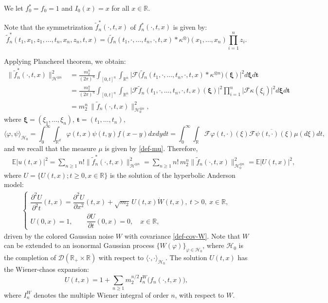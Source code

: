 \documentclass[12pt]{article}
\def\cD{\mathcal{D}}
\def\cF{\mathcal{F}}
\def\cH{\mathcal{H}}
\def\bE{\mathbb{E}}
\def\bR{\mathbb{R}}
\def\k{\kappa}
\begin{document}
We let $f_0^*=f_0=1$ and $I_0(x)=x$ for all $x \in \bR$.

\medskip

Note that the symmetrization 
$\widetilde{f}_n^*(\cdot,t,x)$ of $f_n^*(\cdot,t,x)$ is given by:
\[
\widetilde{f}_n^*(t_1,x_1,z_1,\ldots,t_n,x_n,z_n,t,x)= \big(\widetilde{f}_n(t_1,\cdot,\ldots,t_n,\cdot,t,x) * \k^{\otimes}\big)(x_1,\ldots,x_n) \prod_{i=1}^{n} z_i.
\]

Applying Plancherel theorem, we obtain:
\begin{align}
\nonumber
\|\widetilde{f}_n^*(\cdot,t,x)\|_{\cH^{\otimes n}}^2 &=\frac{m_2^n}{(2\pi)^n} \int_{[0,t]^n}\int_{\bR^n}\big|\cF \big(\widetilde{f}_n(t_1,\cdot,\ldots,t_n,\cdot,t,x)*\k^{\otimes n}\big)(\pmb{\xi})\big|^2 d\pmb{\xi} d\pmb{t}\\
\nonumber
& = \frac{m_2^n}{(2\pi)^n} \int_{[0,t]^n}\int_{\bR^n} \big|\cF \widetilde{f}_n(t_1,\cdot,\ldots,t_n,\cdot,t,x)(\pmb{\xi}) \big|^2 \prod_{i=1}^{n}\big|\cF \k(\xi_i)\big|^2 d\pmb{\xi}d\pmb{t}\\
\label{Poi-Gauss}
& = m_2^n \, \|\widetilde{f}_n(\cdot,t,x)\|_{\cH_0^{\otimes n}}^2,
\end{align}
where $\pmb{\xi}=(\xi_1,\ldots,\xi_n)$, $\pmb{t}=(t_1,\ldots,t_n)$, 
\[
\langle \varphi,\psi \rangle_{\cH_0}=\int_{0}^{\infty}\int_{\bR^d}\varphi(t,x)\psi(t,y)f(x-y)dxdydt 
=\int_0^{\infty}\int_{\bR}\cF \varphi(t,\cdot)(\xi)\overline{\cF \psi(t,\cdot)(\xi)}\mu(d\xi)dt,
\]
and we recall that the measure $\mu$ is given by \eqref{def-mu}. Therefore,
\begin{align*}
& \bE|u(t,x)|^2=\sum_{n\geq 1}n!\| \widetilde{f}_n^*(\cdot,t,x)\|_{\cH^{\otimes n}}^2=
\sum_{n\geq 1}n!\, m_2^n \|\widetilde{f}_n(\cdot,t,x)\|_{\cH_0^{\otimes n}}^2=\bE|U(t,x)|^2,
\end{align*}
where $U=\{U(t,x);t\geq 0,x\in \bR\}$ is the solution of the hyperbolic Anderson model:
\begin{align}
\label{HAM-W}
	\begin{cases}
		\dfrac{\partial^2 U}{\partial^2 t} (t,x)
		=  \dfrac{\partial^2 U}{\partial x^2} (t,x)+\sqrt{m_2}\,U(t,x) \dot{W}(t,x), \
		t>0, \ x \in \bR, \\
		U(0,x) = 1, \quad \quad \dfrac{\partial U}{\partial t} (0,x)=0, \quad x \in \bR,
	\end{cases}
\end{align}
driven by the colored Gaussian noise $W$  with covariance \eqref{def-cov-W}. Note that $W$ can be extended to an isonormal Gaussian process $\{W(\varphi)\}_{\varphi \in \cH_0 }$, where $\cH_0$ is the completion of $\cD(\bR_{+} \times \bR)$ with respect to $\langle \cdot,\cdot \rangle_{\cH_0}$. The solution $U(t,x)$ has the Wiener-chaos expansion:
\begin{equation}
\label{chaos-UW}
U(t,x)=1+\sum_{n\geq 1}m_2^{n/2}I_n^W\big( f_n(\cdot,t,x)\big),
\end{equation}
where $I_n^W$ denotes the multiple Wiener integral of order $n$, with respect to $W$.
\end{document}
